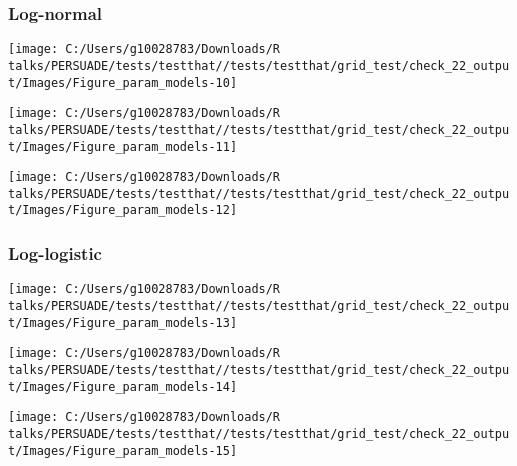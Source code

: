 \documentclass[
]{article}
\begin{document}
\clearpage

\subsubsection{Log-normal}\label{log-normal}

\begin{flushleft}\texttt{[image: C:/Users/g10028783/Downloads/R talks/PERSUADE/tests/testthat//tests/testthat/grid\_test/check\_22\_output/Images/Figure\_param\_models-10]} \end{flushleft}

\begin{flushleft}\texttt{[image: C:/Users/g10028783/Downloads/R talks/PERSUADE/tests/testthat//tests/testthat/grid\_test/check\_22\_output/Images/Figure\_param\_models-11]} \end{flushleft}

\begin{flushleft}\texttt{[image: C:/Users/g10028783/Downloads/R talks/PERSUADE/tests/testthat//tests/testthat/grid\_test/check\_22\_output/Images/Figure\_param\_models-12]} \end{flushleft}

\clearpage

\subsubsection{Log-logistic}\label{log-logistic}

\begin{flushleft}\texttt{[image: C:/Users/g10028783/Downloads/R talks/PERSUADE/tests/testthat//tests/testthat/grid\_test/check\_22\_output/Images/Figure\_param\_models-13]} \end{flushleft}

\begin{flushleft}\texttt{[image: C:/Users/g10028783/Downloads/R talks/PERSUADE/tests/testthat//tests/testthat/grid\_test/check\_22\_output/Images/Figure\_param\_models-14]} \end{flushleft}

\begin{flushleft}\texttt{[image: C:/Users/g10028783/Downloads/R talks/PERSUADE/tests/testthat//tests/testthat/grid\_test/check\_22\_output/Images/Figure\_param\_models-15]} \end{flushleft}

\clearpage
\end{document}
